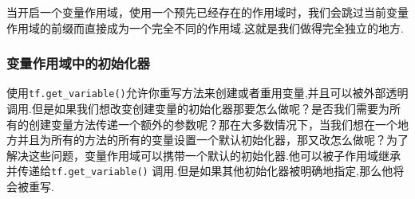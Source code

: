 当开启一个变量作用域，使用一个预先已经存在的作用域时，我们会跳过当前变量作用域的前缀而直接成为一个完全不同的作用域.这就是我们做得完全独立的地方.

\begin{Shaded}
\begin{Highlighting}[]
 \NormalTok{) } 
     \OperatorTok{==} 
 \NormalTok{)}
     \NormalTok{) } 
         \OperatorTok{==} 
          
             \OperatorTok{==}   
\end{Highlighting}
\end{Shaded}

\subsubsection{变量作用域中的初始化器}\label{ux53d8ux91cfux4f5cux7528ux57dfux4e2dux7684ux521dux59cbux5316ux5668}

使用\texttt{tf.get\_variable()}允许你重写方法来创建或者重用变量,并且可以被外部透明调用.但是如果我们想改变创建变量的初始化器那要怎么做呢？是否我们需要为所有的创建变量方法传递一个额外的参数呢？那在大多数情况下，当我们想在一个地方并且为所有的方法的所有的变量设置一个默认初始化器，那又改怎么做呢？为了解决这些问题，变量作用域可以携带一个默认的初始化器.他可以被子作用域继承并传递给\texttt{tf.get\_variable()}
调用.但是如果其他初始化器被明确地指定,那么他将会被重写.

